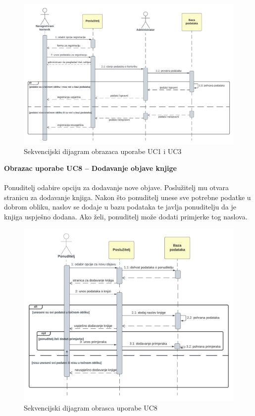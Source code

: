 				\begin{figure}[h]
					\centering
					\includegraphics[width = \textwidth]{slike/sekvUC1UC3.PNG}
					\caption{Sekvencijski dijagram obrazaca uporabe UC1 i UC3}
					\label{fig:enter-label}
				\end{figure}
				\eject
				
				\textbf{Obrazac uporabe UC8 – Dodavanje objave knjige}\\\\
				Ponuditelj odabire opciju za dodavanje nove objave. Poslužitelj mu otvara stranicu za dodavanje knjiga. Nakon što ponuditelj unese sve potrebne podatke u dobrom obliku, naslov se dodaje u bazu podataka te javlja ponuditelju da je knjiga uspješno dodana. Ako želi, ponuditelj može dodati primjerke tog naslova.\\
				
				\begin{figure}[h]
					\centering
					\includegraphics[width = \textwidth]{slike/sekvUC8.PNG}
					\caption{Sekvencijski dijagram obrasca uporabe UC8}
					\label{fig:enter-label}
				\end{figure}
				\eject
				
